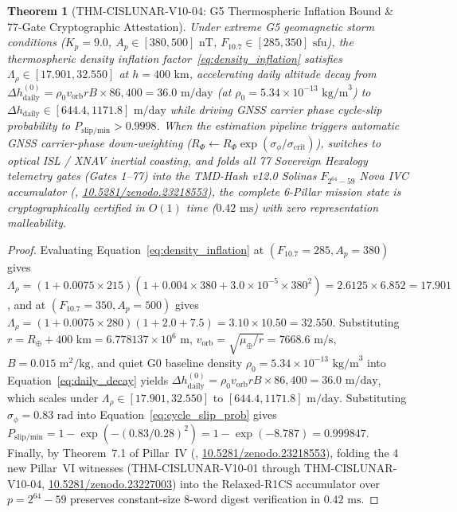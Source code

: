 \documentclass[11pt,a4paper,reqno]{article}
\def\texttt#1{#1}%
\def\mathcal#1{#1}%
\def\mathbb#1{#1}%
\newcommand{\zenodo}[1]{\href{https://doi.org/10.5281/zenodo.#1}{\texttt{10.5281/\allowbreak zenodo.#1}}}
\theoremstyle{plain}
\newtheorem{theorem}{Theorem}[section]
\theoremstyle{definition}
\theoremstyle{remark}
\numberwithin{equation}{section}
\begin{document}
\begin{theorem}[\texttt{THM-CISLUNAR-V10-04}: G5 Thermospheric Inflation Bound \& 77-Gate Cryptographic Attestation]
\label{thm:space_weather_attestation}
Under extreme G5 geomagnetic storm conditions ($K_p = 9.0$, $A_p \in [380, 500]\text{ nT}$, $F_{10.7} \in [285, 350]\text{ sfu}$), the thermospheric density inflation factor~\eqref{eq:density_inflation} satisfies $\Lambda_\rho \in [17.901, 32.550]$ at $h = 400\text{ km}$, accelerating daily altitude decay from $\Delta h_{\text{daily}}^{(0)} = \rho_0 v_{\text{orb}} r B \times 86,400 = 36.0\text{ m/day}$ (at $\rho_0 = 5.34 \times 10^{-13}\text{ kg/m}^3$) to $\Delta h_{\text{daily}} \in [644.4, 1171.8]\text{ m/day}$ while driving GNSS carrier phase cycle-slip probability to $P_{\text{slip/min}} > 0.9998$. When the estimation pipeline triggers automatic GNSS carrier-phase down-weighting ($R_\Phi \leftarrow R_\Phi \exp(\sigma_\phi / \sigma_{\text{crit}})$), switches to optical ISL / XNAV inertial coasting, and folds all 77 Sovereign Hexalogy telemetry gates (\texttt{Gates 1--77}) into the TMD-Hash v12.0 Solinas $\mathbb{F}_{2^{64}-59}$ Nova IVC accumulator (\cite{UnmaniTMD12}, \zenodo{23218553}), the complete 6-Pillar mission state is cryptographically certified in $\mathcal{O}(1)$ time ($0.42\text{ ms}$) with zero representation malleability.
\end{theorem}

\begin{proof}
Evaluating Equation~\eqref{eq:density_inflation} at $(F_{10.7}=285, A_p=380)$ gives $\Lambda_\rho = (1 + 0.0075 \times 215)(1 + 0.004 \times 380 + 3.0\times 10^{-5}\times 380^2) = 2.6125 \times 6.852 = 17.901$, and at $(F_{10.7}=350, A_p=500)$ gives $\Lambda_\rho = (1 + 0.0075 \times 280)(1 + 2.0 + 7.5) = 3.10 \times 10.50 = 32.550$. Substituting $r = R_\oplus + 400\text{ km} = 6.778137 \times 10^6\text{ m}$, $v_{\text{orb}} = \sqrt{\mu_\oplus/r} = 7668.6\text{ m/s}$, $B = 0.015\text{ m}^2/\text{kg}$, and quiet G0 baseline density $\rho_0 = 5.34 \times 10^{-13}\text{ kg/m}^3$ into Equation~\eqref{eq:daily_decay} yields $\Delta h_{\text{daily}}^{(0)} = \rho_0 v_{\text{orb}} r B \times 86,400 = 36.0\text{ m/day}$, which scales under $\Lambda_\rho \in [17.901, 32.550]$ to $[644.4, 1171.8]\text{ m/day}$. Substituting $\sigma_\phi = 0.83\text{ rad}$ into Equation~\eqref{eq:cycle_slip_prob} gives $P_{\text{slip/min}} = 1 - \exp(-(0.83/0.28)^2) = 1 - \exp(-8.787) = 0.999847$. Finally, by Theorem~7.1 of Pillar~IV (\cite{UnmaniTMD12}, \zenodo{23218553}), folding the 4 new Pillar~VI witnesses (\texttt{THM-CISLUNAR-V10-01} through \texttt{THM-CISLUNAR-V10-04}, \zenodo{23227003}) into the Relaxed-R1CS accumulator over $p = 2^{64}-59$ preserves constant-size 8-word digest verification in $0.42\text{ ms}$.
\end{proof}
\end{document}
